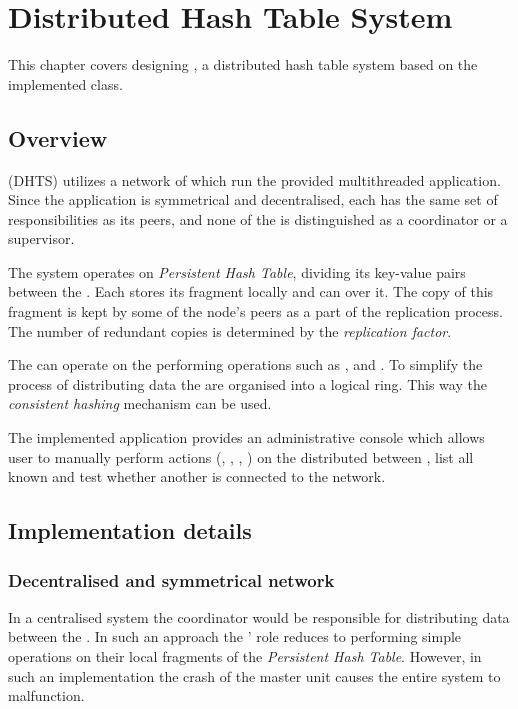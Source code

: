 \chapter{Distributed Hash Table System} \label{Distribution}

This chapter covers designing \DHTS, a distributed hash table system based on the implemented \PHT class.

\section{Overview}

    \DHTS (DHTS) utilizes a network of \Nodes which run the provided multithreaded application.
    Since the application is symmetrical and decentralised, each \Node has the same set of responsibilities as its peers, and none of the \Nodes is distinguished as a coordinator or a supervisor.

    The system operates on \textit{Persistent Hash Table}, dividing its key-value pairs between the \Nodes.
    Each \Node stores its \PHT fragment locally and can \iterateMethod over it.
    The copy of this fragment is kept by some of the node's peers as a part of the replication process. 
    The number of redundant copies is determined by the \textit{replication factor}.
    
    The \Nodes can operate on the \PHT performing operations such as \insertMethod, \getMethod and \removeMethod.
    To simplify the process of distributing data the \Nodes are organised into a logical ring.
    This way the \textit{consistent hashing} mechanism can be used.
    
    The implemented application provides an administrative console which allows user to manually perform actions (\insertMethod, \getMethod, \removeMethod, \iterateMethod) on the \PHT distributed between \Nodes, list all known \Nodes and test whether another \Node is connected to the network.
    
\section{Implementation details}
    \subsection{Decentralised and symmetrical network}
        In a centralised system the coordinator would be responsible for distributing data between the \Nodes. 
        In such an approach the \Nodes' role reduces to performing simple \PHT operations on their local fragments of the \textit{Persistent Hash Table}.
        However, in such an implementation the crash of the master unit causes the entire system to malfunction.
        
